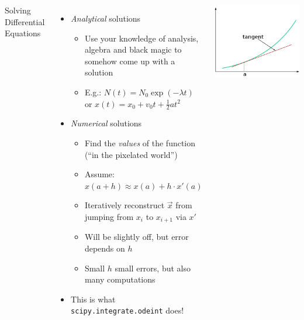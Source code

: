 \begin{frame}[fragile]
%
\begin{columns}[t]
\begin{Large}
	{Solving Differential Equations}
	\vspace{6pt}
\end{Large}
%
\begin{itemize}
\item \emph{Analytical} solutions
	\begin{itemize}
	\item Use your knowledge of analysis, algebra and black magic to somehow come up with a solution
	\item E.\;g.: $N(t) = N_0 \exp(-\lambda t)$ or $x(t) = x_0 + v_0 t + \frac{1}{2} at^2$
	\end{itemize}
\item \emph{Numerical} solutions
	\begin{itemize}
	\item Find the \emph{values} of the function (\enquote{in the pixelated world})
	\item Assume: $x(a + h) \approx x(a) + h \cdot x'(a)$
	\item Iteratively reconstruct $\vec{x}$ from jumping from $x_i$ to $x_{i+1}$ via $x'$
	\item Will be slightly off, but error depends on $h$
	\item Small $h$ \Thus small errors, but also many computations
	\end{itemize}
\item This is what \texttt{scipy.integrate.odeint} does!
\end{itemize}
\begin{center}
	\includegraphics[width=\linewidth]{./gfx/tangent}

\end{center}
\end{columns}
\end{frame}

